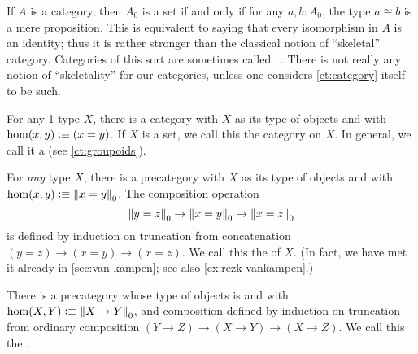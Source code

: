 \documentclass[hott-all.tex]{subfiles}
\begin{document}
\begin{eg}\label{ct:gaunt}
  If $A$ is a category, then $A_0$ is a set if and only if for any $a,b:A_0$, the type $a\cong b$ is a mere proposition.
  This is equivalent to saying that every isomorphism in $A$ is an identity; thus it is rather stronger than the classical notion of ``skeletal'' category.
  Categories of this sort are sometimes called ~\cite{bsp12infncats}.
  There is not really any notion of ``skeletality'' for our categories, unless one considers \cref{ct:category} itself to be such.
\end{eg}

\begin{eg}\label{ct:discrete}
  For any 1-type $X$, there is a category with $X$ as its type of objects and with $\hom(x,y) \vcentcolon\equiv (x=y)$.
  If $X$ is a set, we call this the 
  category on $X$.
  In general, we call it a 
  (see \cref{ct:groupoids}).
\end{eg}

\begin{eg}\label{ct:fundgpd}
  For \emph{any} type $X$, there is a precategory with $X$ as its type of objects and with $\hom(x,y) \vcentcolon\equiv \mathopen{}\left\Vert x=y\right\Vert_{0}\mathclose{}$.
  The composition operation
  \[ \mathopen{}\left\Vert y=z\right\Vert_{0}\mathclose{} \to \mathopen{}\left\Vert x=y\right\Vert_{0}\mathclose{} \to \mathopen{}\left\Vert x=z\right\Vert_{0}\mathclose{} \]
  is defined by induction on truncation from concatenation $(y=z)\to(x=y)\to(x=z)$.
  We call this the 
  of $X$.
  (In fact, we have met it already in \cref{sec:van-kampen}; see also \cref{ex:rezk-vankampen}.)
\end{eg}

\begin{eg}\label{ct:hoprecat}
  There is a precategory whose type of objects is \type and with $\hom(X,Y) \vcentcolon\equiv \mathopen{}\left\Vert X\to Y\right\Vert_{0}\mathclose{}$, and composition defined by induction on truncation from ordinary composition $(Y\to Z) \to (X\to Y) \to (X\to Z)$.
  We call this the .
\end{eg}
\end{document}
